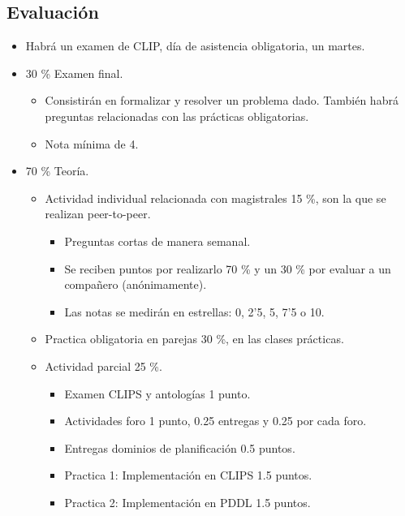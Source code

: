 \documentclass[12pt, twoside, openright]{report} %
\begin{document}
\subsection{Evaluación}
\begin{itemize}
	\item Habrá un examen de CLIP, día de asistencia obligatoria, un martes.
	\item 30 \% Examen final.
	      \begin{itemize}
		      \item Consistirán en formalizar y resolver un problema dado. También habrá preguntas relacionadas con las prácticas obligatorias.
		      \item Nota mínima de 4.
	      \end{itemize}
	\item 70 \% Teoría.
	      \begin{itemize}
		      \item Actividad individual relacionada con magistrales 15 \%, son la que se realizan peer-to-peer.
		            \begin{itemize}
			            \item Preguntas cortas de manera semanal.
			            \item Se reciben puntos por realizarlo 70 \% y un 30 \% por evaluar a un compañero (anónimamente).
			            \item Las notas se medirán en estrellas: 0, 2'5, 5, 7'5 o 10.
		            \end{itemize}
		      \item Practica obligatoria en parejas 30 \%, en las clases prácticas.
		      \item Actividad parcial 25 \%.
		            \begin{itemize}
			            \item Examen CLIPS y antologías 1 punto.
			            \item Actividades foro 1 punto, 0.25 entregas  y 0.25 por cada foro.
			            \item Entregas dominios de planificación 0.5 puntos.
			            \item Practica 1: Implementación en CLIPS 1.5 puntos.
			            \item Practica 2: Implementación en PDDL 1.5 puntos.
		            \end{itemize}
	      \end{itemize}
\end{itemize}
\end{document}
